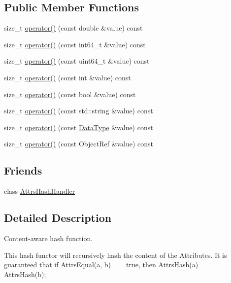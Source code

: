 \subsection*{Public Member Functions}
\begin{DoxyCompactItemize}
\item 
size\+\_\+t \hyperlink{classtvm_1_1AttrsHash_a17271e9215dcc670fd82b6f54dcdd160}{operator()} (const double \&value) const 
\item 
size\+\_\+t \hyperlink{classtvm_1_1AttrsHash_aa2bccb3fda57c4b96f14f2d77564382b}{operator()} (const int64\+\_\+t \&value) const 
\item 
size\+\_\+t \hyperlink{classtvm_1_1AttrsHash_a164a440cd00993b74fb74644d3cb234a}{operator()} (const uint64\+\_\+t \&value) const 
\item 
size\+\_\+t \hyperlink{classtvm_1_1AttrsHash_aa69c6ed1824bd0818e2dd49384faaa8f}{operator()} (const int \&value) const 
\item 
size\+\_\+t \hyperlink{classtvm_1_1AttrsHash_adfbed9e31f46503bc792ba0fa9c1dd5e}{operator()} (const bool \&value) const 
\item 
size\+\_\+t \hyperlink{classtvm_1_1AttrsHash_aa2e71ac14e2fb6eec6e510e95e6e4709}{operator()} (const std\+::string \&value) const 
\item 
size\+\_\+t \hyperlink{classtvm_1_1AttrsHash_a194e030739814e7419cc71575efad949}{operator()} (const \hyperlink{namespacetvm_a41918af1a1dc386388639a9d3ad06c5d}{Data\+Type} \&value) const 
\item 
size\+\_\+t \hyperlink{classtvm_1_1AttrsHash_a76a5eedbe7802765bdbe75492e4a77bc}{operator()} (const Object\+Ref \&value) const 
\end{DoxyCompactItemize}
\subsection*{Friends}
\begin{DoxyCompactItemize}
\item 
class \hyperlink{classtvm_1_1AttrsHash_a1070cab2b30682fe2945c7b68f461036}{Attrs\+Hash\+Handler}
\end{DoxyCompactItemize}


\subsection{Detailed Description}
Content-\/aware hash function. 

This hash functor will recursively hash the content of the Attributes. It is guaranteed that if Attrs\+Equal(a, b) == true, then Attrs\+Hash(a) == Attrs\+Hash(b); 

